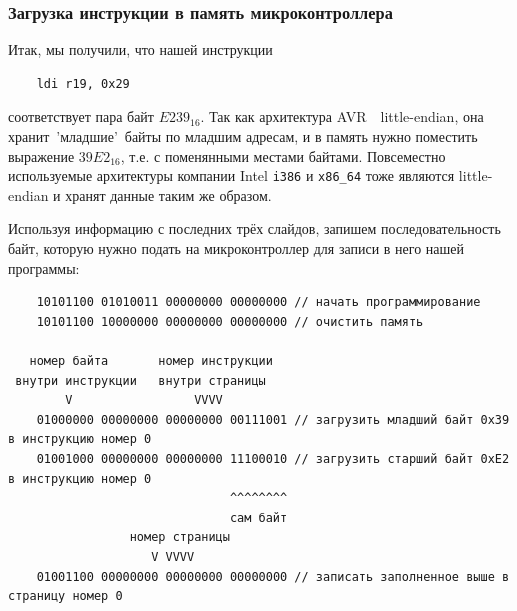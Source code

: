 \documentclass[aspectratio=169, pdf, 8pt, unicode]{beamer}
\begin{document}
\begin{frame}[fragile]
\frametitle{Загрузка инструкции в память микроконтроллера}
	Итак, мы получили, что нашей инструкции
	\begin{lstlisting}
	ldi r19, 0x29
	\end{lstlisting}
	соответствует пара байт $E239_{16}$. Так как архитектура AVR\ \cyrdash\ little-endian, она хранит\ 'младшие'\
	байты по младшим адресам, и в память нужно поместить выражение $39E2_{16}$, т.е. с поменянными местами байтами.
	Повсеместно используемые архитектуры компании Intel \texttt{i386} и \texttt{x86\_64} тоже являются little-endian
	и хранят данные таким же образом.

	Используя информацию с последних трёх слайдов, запишем последовательность байт, которую нужно подать на микроконтроллер
	для записи в него нашей программы:
	\begin{verbatim}
    10101100 01010011 00000000 00000000 // начать программирование
    10101100 10000000 00000000 00000000 // очистить память

   номер байта       номер инструкции
 внутри инструкции   внутри страницы
        V                 VVVV
    01000000 00000000 00000000 00111001 // загрузить младший байт 0x39 в инструкцию номер 0
    01001000 00000000 00000000 11100010 // загрузить старший байт 0xE2 в инструкцию номер 0
                               ^^^^^^^^
                               сам байт
                 номер страницы
                    V VVVV
    01001100 00000000 00000000 00000000 // записать заполненное выше в страницу номер 0
	\end{verbatim}
\end{frame}
\end{document}
